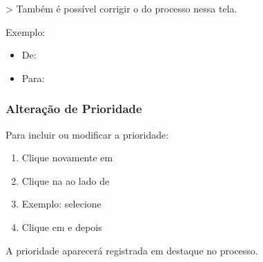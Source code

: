 \documentclass[letterpaper,10pt,brazil]{sphinxmanual}
\begin{document}
\sphinxAtStartPar
\textgreater{} Também é possível corrigir o  do processo nessa tela.

\sphinxAtStartPar
Exemplo:
\begin{itemize}
\item {} 
\sphinxAtStartPar
De: 

\item {} 
\sphinxAtStartPar
Para: 

\end{itemize}


\subsubsection{Alteração de Prioridade}
\label{\detokenize{projud_19_evolucao_retificacao:alteracao-de-prioridade}}
\sphinxAtStartPar
Para incluir ou modificar a prioridade:
\begin{enumerate}
%
\item {} 
\sphinxAtStartPar
Clique novamente em 

\item {} 
\sphinxAtStartPar
Clique na  ao lado de 

\item {} 
\sphinxAtStartPar
Exemplo: selecione 

\item {} 
\sphinxAtStartPar
Clique em  e depois 

\end{enumerate}

\sphinxAtStartPar
A prioridade aparecerá registrada em destaque no processo.
\end{document}
